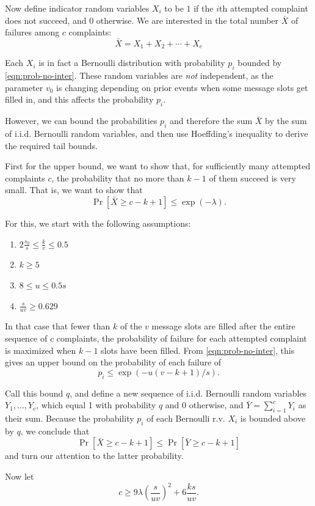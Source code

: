 \documentclass[letterpaper,12pt]{article}
\begin{document}
Now define indicator random variables $X_i$ to be $1$ if the $i$th
attempted complaint does not succeed, and $0$ otherwise. We are
interested in the total number $\bar{X}$ of failures among $c$
complaints:
\[
  \bar{X} = X_1 + X_2 + \cdots + X_c
\]

Each $X_i$ is in fact a Bernoulli distribution with probability $p_i$
bounded by \eqref{eqn:prob-no-inter}. These random variables are
\emph{not} independent, as the parameter $v_0$ is changing
depending on prior events when some message slots get filled in, and
this affects the probability $p_i$.

However, we can bound the probabilities $p_i$ and therefore the sum
$\bar{X}$ by the sum of i.i.d. Bernoulli random variables, and then use
Hoeffding's inequality to derive the required tail bounds.

First for the upper bound, we want to show that, for sufficiently many
attempted complaints $c$, the probability that no more than $k-1$ of
them succeed is very small. That is, we want to show that
\[\Pr[\bar{X} \ge c-k+1] \le \exp(-\lambda).\]

For this, we start with the following assumptions:
\begin{enumerate}
  \item \label{ass:kv}
    \(2\frac{s_0}{s} \le \frac{k}{v} \le 0.5\)
  \item \label{ass:k}
    \(k \ge 5\)
  \item \label{ass:u}
    \(8 \le u \le 0.5s\)
  \item \label{ass:uv}
    \(\frac{s}{uv} \ge 0.629\)
\end{enumerate}

In that case that fewer than $k$ of the $v$ message slots are filled
after the entire sequence of $c$ complaints, the probability of failure
for each attempted complaint is maximized when $k-1$ slots have been
filled. From \eqref{eqn:prob-no-inter}, this gives an upper bound on the
probability of each failure of
\[p_i \le \exp({-u(v-k+1)/s}).\]

Call this bound $q$, and define a new sequence of i.i.d. Bernoulli random variables
$Y_1,\ldots,Y_c$, which equal 1 with probability $q$ and 0 otherwise,
and $\bar{Y} = \sum_{i=1}^c Y_i$ as their sum. Because the probability
$p_i$ of each Bernoulli r.v. $X_i$ is bounded above by $q$, we conclude
that
\[\Pr[\bar{X} \ge c-k+1] \le \Pr[\bar{Y} \ge c-k+1]\]
and turn our attention to the latter probability.

Now let
\begin{equation}\label{eqn:c-upper-tail}
  c \ge 9\lambda\left(\frac{s}{uv}\right)^2 + 6\frac{ks}{uv}.
\end{equation}
\end{document}
